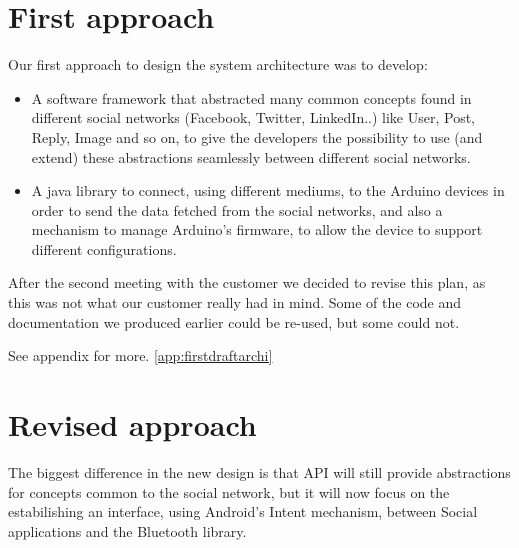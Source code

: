 \section{First approach}

Our first approach to design the system architecture was to develop:

\begin{itemize}
\item A software framework that
abstracted many common concepts found in different social networks (Facebook, Twitter, LinkedIn..)
like User, Post, Reply, Image and so on, to give the developers the possibility to use
(and extend) these abstractions seamlessly between different social networks.
\end{itemize}

\begin{itemize}
\item A java library to connect, using different mediums, to the Arduino devices in order
to send the data fetched from the social networks, and also a mechanism to manage Arduino's firmware,
to allow the device to support different configurations.
\end{itemize}

After the second meeting with the customer we decided to revise this plan, as this was not what
our customer really had in mind. Some of the code and documentation we produced earlier could be re-used, but some could not.

See appendix for more. \ref{app:firstdraftarchi}

\section{Revised approach}
The biggest difference in the new design is that API will still provide abstractions
for concepts common to the social network, but it will now focus on the estabilishing an interface,
using Android's Intent mechanism, between Social applications and the Bluetooth library.

\newpage
